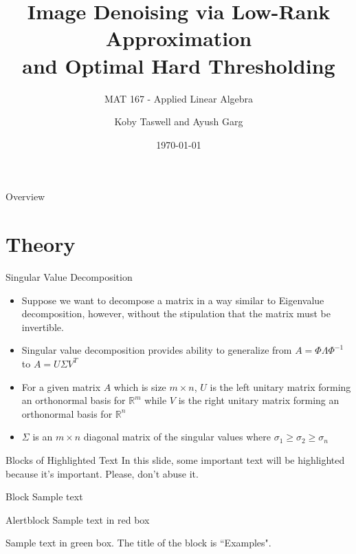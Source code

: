\documentclass[aspectratio=169,xcolor=dvipsnames]{beamer}
\title[Denoising with SVD]{Image Denoising via Low-Rank Approximation\\ and Optimal Hard Thresholding}
\subtitle{MAT 167 - Applied Linear Algebra}
\author[Taswell and Garg] {Koby Taswell and Ayush Garg}
\institute[UCD] %
{
	University of California, Davis 
	\vskip 3pt
}
\date{\today} %
\begin{document}
	
	\begin{frame}
		\titlepage
	\end{frame}
	
	\begin{frame}{Overview}
		\tableofcontents
	\end{frame}
	
	\section{Theory}
	
	\begin{frame}{Singular Value Decomposition}
		\begin{itemize}
			\item Suppose we want to decompose a matrix in a way similar to Eigenvalue decomposition, however, without the stipulation that the matrix must be invertible.
			\item Singular value decomposition provides ability to generalize from $A = \Phi\Lambda\Phi^{-1}$ to $A = U\Sigma V^{T}$
			\item For a given matrix $A$ which is size $m\times n$, $U$ is the left unitary matrix forming an orthonormal basis for $\mathbb{R}^m$  while $V$ is the right unitary matrix forming an orthonormal basis for $\mathbb{R}^n$
			\item $\Sigma$ is an $m\times n$ diagonal matrix of the singular values where $\sigma_1 \geq \sigma_2 \geq \sigma_n$
		\end{itemize}
	\end{frame}
	
	
	\begin{frame}{Blocks of Highlighted Text}
		In this slide, some important text will be \alert{highlighted} because it's important. Please, don't abuse it.
		
		\begin{block}{Block}
			Sample text
		\end{block}
		
		\begin{alertblock}{Alertblock}
			Sample text in red box
		\end{alertblock}
		
		\begin{examples}
			Sample text in green box. The title of the block is ``Examples".
		\end{examples}
	\end{frame}
	
\end{document}

